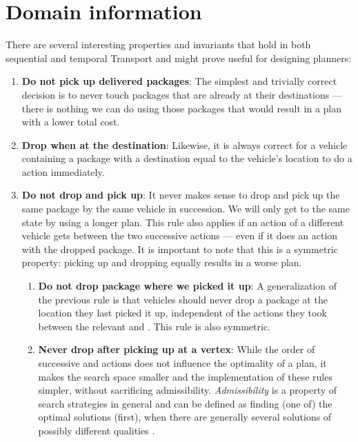 \section{Domain information}

There are several interesting properties and invariants that hold in both sequential and temporal Transport and might prove useful for designing planners:
\begin{enumerate}
\item \textbf{Do not pick up delivered packages}: The simplest and trivially correct decision is to never touch packages that are already at their destinations --- there is nothing
we can do using those packages that would result in a plan with a lower total cost.

\item \textbf{Drop when at the destination}: Likewise, it is
always correct for a vehicle containing a package with a destination equal
to the vehicle's location to do a \drop{} action immediately.

\item \textbf{Do not drop and pick up}: It never makes sense to drop and pick up
the same package by the same vehicle in succession. We will only get to the same state
by using a longer plan. This rule also applies if an action of a different vehicle
gets between the two successive actions --- even if it does an action with the
dropped package.
It is important to note that this is a symmetric property: picking up and dropping
equally results in a worse plan.
\begin{enumerate}
\item \textbf{Do not drop package where we picked it up}: A generalization
of the previous rule is that vehicles should never drop a package
at the location they last picked it up, independent of the actions they took
between the relevant \pickup{} and \drop{}. This rule is also symmetric.

\item \textbf{Never drop after picking up at a vertex}:
While the order of successive \pickup{} and \drop{} actions does not
influence the optimality of a plan, it makes the search space smaller and the implementation of these rules simpler,
without sacrificing admissibility. \textit{Admissibility} is
a property of search strategies in general and can be defined as finding
(one of) the optimal solutions (first), when there are generally several solutions
of possibly different qualities \citep[Section~3.5]{Russell1995}.
\end{enumerate}


\end{enumerate}
